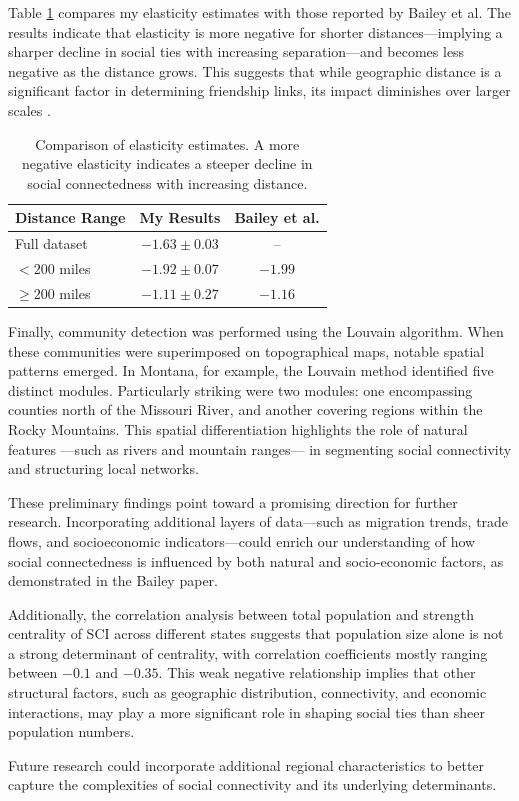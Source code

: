 Table \ref{tab:elasticity_comparison} compares my elasticity estimates with those reported by Bailey et al. The results indicate that elasticity is more negative for shorter distances—implying a sharper decline in social ties with increasing separation—and becomes less negative as the distance grows. This suggests that while geographic distance is a significant factor in determining friendship links, its impact diminishes over larger scales \cite{Bailey2018}.

\begin{table}[h]
    \centering
    \begin{tabular}{lcc}
        \hline
        Distance Range & My Results & Bailey et al. \\ 
        \hline
        Full dataset & $-1.63 \pm 0.03$ & -- \\ 
        $< 200$ miles & $-1.92 \pm 0.07$ & $-1.99$ \\ 
        $\geq 200$ miles & $-1.11 \pm 0.27$ & $-1.16$ \\ 
        \hline
    \end{tabular}
    \caption{Comparison of elasticity estimates. A more negative elasticity indicates a steeper decline in social connectedness with increasing distance.}
    \label{tab:elasticity_comparison}
\end{table}

Finally, community detection was performed using the Louvain algorithm. When these communities were superimposed on topographical maps, notable spatial patterns emerged. In Montana, for example, the Louvain method identified five distinct modules. Particularly striking were two modules: one encompassing counties north of the Missouri River, and another covering regions within the Rocky Mountains. This spatial differentiation highlights the role of natural features —such as rivers and mountain ranges— in segmenting social connectivity and structuring local networks.

These preliminary findings point toward a promising direction for further research. Incorporating additional layers of data—such as migration trends, trade flows, and socioeconomic indicators—could enrich our understanding of how social connectedness is influenced by both natural and socio-economic factors, as demonstrated in the Bailey paper. 

Additionally, the correlation analysis between total population and strength centrality of SCI across different states suggests that population size alone is not a strong determinant of centrality, with correlation coefficients mostly ranging between $-0.1$ and $-0.35$. This weak negative relationship implies that other structural factors, such as geographic distribution, connectivity, and economic interactions, may play a more significant role in shaping social ties than sheer population numbers. 

Future research could incorporate additional regional characteristics to better capture the complexities of social connectivity and its underlying determinants.


\newpage